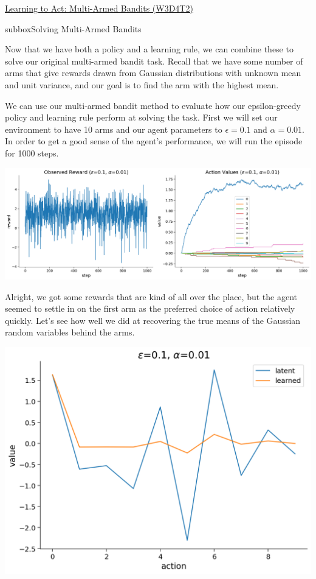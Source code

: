 \begin{textbox}{\href{https://compneuro.neuromatch.io/tutorials/W3D4_ReinforcementLearning/student/W3D4_Tutorial2.html}{Learning to Act: Multi-Armed Bandits (W3D4T2)} }

\begin{subbox}{subbox}{Solving Multi-Armed Bandits}
\scriptsize

Now that we have both a policy and a learning rule, we can combine these to solve our original multi-armed bandit task. Recall that we have some number of arms that give rewards drawn from Gaussian distributions with unknown mean and unit variance, and our goal is to find the arm with the highest mean.

We can use our multi-armed bandit method to evaluate how our epsilon-greedy policy and learning rule perform at solving the task. First we will set our environment to have 10 arms and our agent parameters to $\epsilon=0.1$ and $\alpha=0.01$. In order to get a good sense of the agent's performance, we will run the episode for 1000 steps.
\begin{center}
    
\includegraphics[scale=0.15]{Figures/RL/RL_Figure9.png}
\end{center}

Alright, we got some rewards that are kind of all over the place, but the agent seemed to settle in on the first arm as the preferred choice of action relatively quickly. Let's see how well we did at recovering the true means of the Gaussian random variables behind the arms.
\begin{center}
    
\includegraphics[scale=0.15]{Figures/RL/RL_Figure10.png}
\end{center}



\end{subbox}
\end{textbox}
